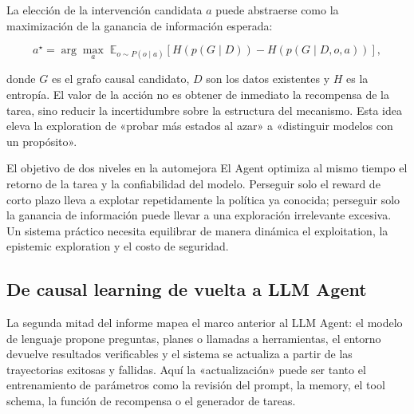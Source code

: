 

La elección de la intervención candidata $a$ puede abstraerse como la maximización de la ganancia de información esperada:

$$
a^{\star}=\arg\max_a\;\mathbb{E}_{o\sim P(o\mid a)}
\left[H\!\left(p(G\mid D)\right)-H\!\left(p(G\mid D,o,a)\right)\right],
$$

donde $G$ es el grafo causal candidato, $D$ son los datos existentes y $H$ es la entropía. El valor de la acción no es obtener de inmediato la recompensa de la tarea, sino reducir la incertidumbre sobre la estructura del mecanismo. Esta idea eleva la exploration de «probar más estados al azar» a «distinguir modelos con un propósito».

\begin{importantbox}{El objetivo de dos niveles en la automejora}
El Agent optimiza al mismo tiempo el retorno de la tarea y la confiabilidad del modelo. Perseguir solo el reward de corto plazo lleva a explotar repetidamente la política ya conocida; perseguir solo la ganancia de información puede llevar a una exploración irrelevante excesiva. Un sistema práctico necesita equilibrar de manera dinámica el exploitation, la epistemic exploration y el costo de seguridad.
\end{importantbox}


\subsection{De causal learning de vuelta a LLM Agent}

La segunda mitad del informe mapea el marco anterior al LLM Agent: el modelo de lenguaje propone preguntas, planes o llamadas a herramientas, el entorno devuelve resultados verificables y el sistema se actualiza a partir de las trayectorias exitosas y fallidas. Aquí la «actualización» puede ser tanto el entrenamiento de parámetros como la revisión del prompt, la memory, el tool schema, la función de recompensa o el generador de tareas.

